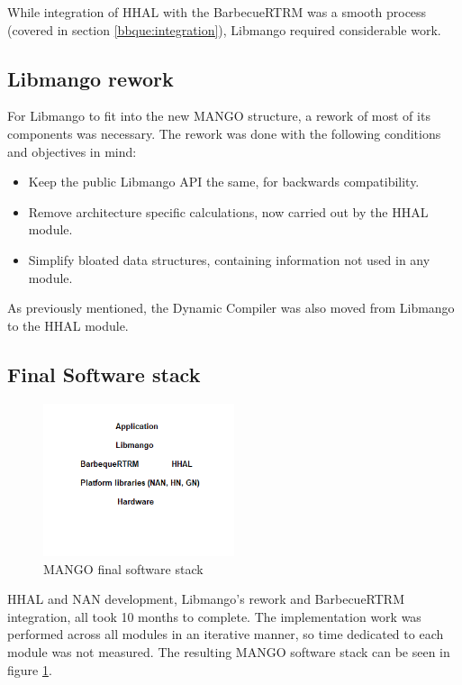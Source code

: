 While integration of HHAL with the BarbecueRTRM was a smooth process (covered in section \ref{bbque:integration}), Libmango required considerable work.

\subsection{Libmango rework}

For Libmango to fit into the new MANGO structure, a rework of most of its components was necessary. The rework was done with the following conditions and objectives in mind:
\begin{itemize}
    \item Keep the public Libmango API the same, for backwards compatibility.
    \item Remove architecture specific calculations, now carried out by the HHAL module.
    \item Simplify bloated data structures, containing information not used in any module.
\end{itemize}

As previously mentioned, the Dynamic Compiler was also moved from Libmango to the HHAL module.

\subsection{Final Software stack}

\begin{figure}[ht]
    \centering
    \includegraphics[width=0.5\textwidth]{img/mango-final-stack.png}
    \captionsetup{justification=centering}
    \caption{MANGO final software stack}
    \label{fig:mango_final_stack}
\end{figure}

HHAL and NAN development, Libmango's rework and BarbecueRTRM integration, all took 10 months to complete. The implementation work was performed across all modules in an iterative manner, so time dedicated to each module was not measured.
The resulting MANGO software stack can be seen in figure \ref{fig:mango_final_stack}.

